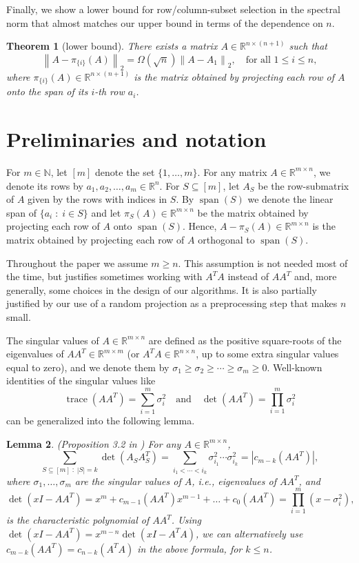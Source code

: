 \documentclass[11pt]{article}
\newcommand{\NN}{\mathbb{N}}
\newtheorem{theorem}{Theorem}
\newtheorem{lemma}[theorem]{Lemma}
\def\reals{\mathbb{R}}
\def\suchthat{\;:\;}
\newcommand{\tr}[1]{\operatorname{trace}\left(#1\right)}
\newcommand{\deter}[1]{\operatorname{det}\left(#1\right)}
\newcommand{\linspan}[1]{\operatorname{span}\left(#1\right)}
\newcommand{\norm}[1]{\left\|#1\right\|}
\newcommand{\abs}[1]{\left|#1\right|}
\newcommand{\size}[1]{\left|#1\right|}
\begin{document}
Finally, we show a lower bound for row/column-subset selection in the spectral norm that almost matches our upper bound in terms of the dependence on $n$.
\begin{theorem}[lower bound] \label{thm:lower-bound}
There exists a matrix $A \in \reals^{n \times (n+1)}$ such that
\[
\norm{A - \pi_{\{i\}}(A)}_{2} = \Omega(\sqrt{n}) \norm{A - A_{1}}_{2}, \quad \text{for all $1 \leq i \leq n$},
\]
where $\pi_{\{i\}}(A) \in \reals^{n \times (n+1)}$ is the matrix obtained by projecting each row of $A$ onto the span of its $i$-th row $a_{i}$.
\end{theorem}


\section{Preliminaries and notation}\label{sec:prelim}
For $m \in \NN$, let $[m]$ denote the set $\{1, \dotsc, m\}$. For any matrix $A \in \reals^{m \times n}$, we denote its rows by $a_{1}, a_{2}, \dots, a_{m} \in \reals^{n}$. For $S \subseteq [m]$, let $A_{S}$ be the row-submatrix of $A$ given by the rows with indices in $S$. By $\linspan{S}$ we denote the linear span of $\{a_{i} \suchthat i \in S\}$ and let $\pi_{S}(A) \in \reals^{m \times n}$ be the matrix obtained by projecting each row of $A$ onto $\linspan{S}$. Hence, $A - \pi_{S}(A) \in \reals^{m \times n}$ is the matrix obtained by projecting each row of $A$ orthogonal to $\linspan{S}$.

Throughout the paper we assume $m \geq n$. This assumption is not needed most of the time, but justifies sometimes working with $A^T A$ instead of $A A^T$ and, more generally, some choices in the design of our algorithms. It is also partially justified by our use of a random projection as a preprocessing step that makes $n$ small.

The singular values of $A \in \reals^{m \times n}$ are defined as the positive square-roots of the eigenvalues of $AA^{T} \in \reals^{m \times m}$ (or $A^{T}A \in \reals^{n \times n}$, up to some extra singular values equal to zero), and we denote them by $\sigma_{1} \geq \sigma_{2} \geq \dotsb \geq \sigma_{m} \geq 0$. Well-known identities of the singular values like
\[
\tr{AA^{T}} = \sum_{i=1}^{m} \sigma_{i}^{2} \quad \text{and} \quad \deter{AA^{T}} = \prod_{i=1}^{m} \sigma_{i}^{2}
\]
can be generalized into the following lemma.


\begin{lemma} (Proposition 3.2 in \cite{DRVW}) \label{lemma:char-poly}
For any $A \in \reals^{m \times n}$,
\[
\sum_{S \subseteq [m] \suchthat \size{S}=k} \deter{A_{S} A_{S}^{T}} = \sum_{i_{1} < \dotsb < i_{k}} \sigma_{i_{1}}^{2} \dotsb \sigma_{i_{k}}^{2} = \abs{c_{m-k}(AA^{T})},
\]
where $\sigma_{1}, \dotsc, \sigma_{m}$ are the singular values of $A$, i.e., eigenvalues of $AA^{T}$, and
\[
\deter{xI - AA^{T}} = x^{m} + c_{m-1}(AA^{T}) x^{m-1} + \dotsc + c_{0}(AA^{T}) = \prod_{i=1}^{m} (x - \sigma_{i}^{2}),
\]
is the characteristic polynomial of $AA^{T}$. Using $\deter{xI - AA^{T}} = x^{m-n} \deter{xI - A^{T}A}$, we can alternatively use $c_{m-k} (AA^{T}) = c_{n-k}(A^{T}A)$ in the above formula, for $k \leq n$.
\end{lemma}
\end{document}
